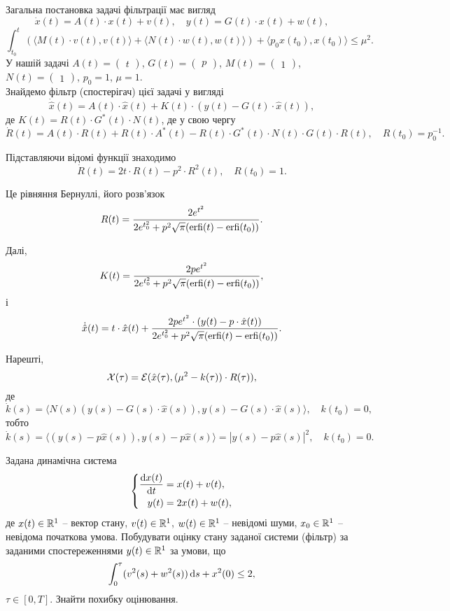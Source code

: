 \begin{solution}
	Загальна постановка задачі фільтрації має вигляд \[ \dot x (t)= A (t) \cdot x (t)+ v (t), \quad y (t)= G (t) \cdot x(t) + w(t),\] \[\int_{t_0}^t ( \langle M(t) \cdot v(t), v(t)\rangle + \langle N(t) \cdot w(t), w(t)\rangle )  + \langle p_0 x(t_0), x(t_0) \rangle \le \mu^2. \] У нашій задачі $A (t)= \begin{pmatrix} t \end{pmatrix}$, $G (t)= \begin{pmatrix} p \end{pmatrix}$, $M (t)= \begin{pmatrix} 1 \end{pmatrix}$, $N (t)= \begin{pmatrix} 1 \end{pmatrix}$, $p_0 = 1$, $\mu = 1$. \\

	Знайдемо фільтр (спостерігач) цієї задачі у вигляді \[ \dot{\hat{x}} (t) = A (t) \cdot \hat x (t) + K (t) \cdot (y (t) - G (t) \cdot \hat x (t)), \] де $K (t)= R (t) \cdot G^* (t) \cdot N(t)$, де у свою чергу \[\dot R (t)= A (t) \cdot R (t)+ R (t) \cdot A^* (t)- R (t) \cdot G^* (t) \cdot N (t) \cdot G (t) \cdot R(t), \quad R(t_0) = p_0^{-1}. \]

 	Підставляючи відомі функції знаходимо \[\dot R (t)= 2 t \cdot R (t) - p^2 \cdot R^2(t), \quad R(t_0) = 1. \]

 	Це рівняння Бернуллі, його розв'язок \[ R(t) = \frac{2 e^{t^2}}{2 e^{t_0^2} + p^2 \sqrt{\pi} (\operatorname{erfi}(t) - \operatorname{erfi}(t_0))}. \]

 	Далі, \[ K(t) = \frac{2 p e^{t^2}}{2 e^{t_0^2} + p^2 \sqrt{\pi} (\operatorname{erfi}(t) - \operatorname{erfi}(t_0))}, \] і \[ \dot{\hat{x}} (t) = t \cdot \hat x (t) + \frac{2 p e^{t^2} \cdot (y (t) - p \cdot \hat x (t))}{2 e^{t_0^2} + p^2 \sqrt{\pi} (\operatorname{erfi}(t) - \operatorname{erfi}(t_0))}. \]

 	Нарешті, \[ \mathcal{X}(\tau) = \mathcal{E} (\hat x(\tau), (\mu^2 - k(\tau)) \cdot R(\tau)), \] де \[ \dot k (s) = \langle N(s) (y(s) - G(s) \cdot \hat x(s)), y(s) - G(s) \cdot \hat x(s)\rangle, \quad k(t_0) = 0, \] тобто \[ \dot k (s) = \langle (y(s) - p \hat x(s)), y(s) - p \hat x(s)\rangle = |y(s) - p \hat x(s)|^2, \quad k(t_0) = 0. \]
\end{solution}

\begin{problem}
	Задана динамічна система \[ \left\{ \begin{aligned}
		\frac{\mathop{}\!\mathrm{d} x(t)}{\mathop{}\!\mathrm{d} t} &= x(t) + v(t), \\
		y(t) &= 2 x(t) + w(t),
	\end{aligned} \right. \]
	де $x(t) \in \mathbb{R}^1$ -- вектор стану, $v(t) \in \mathbb{R}^1$, $w(t) \in \mathbb{R}^1$ -- невідомі шуми, $x_0 \in \mathbb{R}^1$ -- невідома початкова умова. Побудувати оцінку стану заданої системи (фільтр) за заданими спостереженнями $y(t) \in \mathbb{R}^1$ за умови, що \[ \int_0^\tau (v^2(s) + w^2(s)) \mathop{}\!\mathrm{d} s + x^2(0) \le 2, \] $\tau \in [0, T]$. Знайти похибку оцінювання.
\end{problem}

